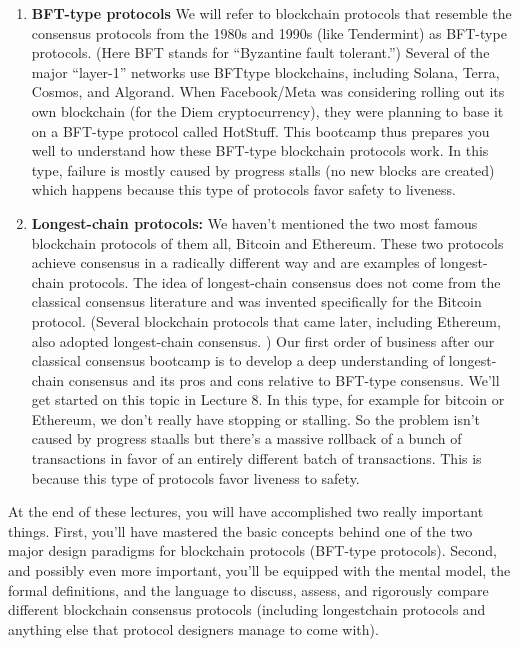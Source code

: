 \begin{enumerate}
    \item \textbf{BFT-type protocols} We will refer to blockchain protocols that resemble the consensus
    protocols from the 1980s and 1990s (like Tendermint) as BFT-type protocols. (Here BFT
    stands for “Byzantine fault tolerant.”) Several of the major “layer-1” networks use BFTtype blockchains, including Solana, Terra, Cosmos, and Algorand. When Facebook/Meta
    was considering rolling out its own blockchain (for the Diem cryptocurrency), they were
    planning to base it on a BFT-type protocol called HotStuff. This bootcamp thus prepares
    you well to understand how these BFT-type blockchain protocols work. In this type, failure is mostly caused by progress stalls (no new blocks are created) which happens because this type of protocols favor safety to liveness.

 \item \textbf{Longest-chain protocols:} We haven't mentioned the two
    most famous blockchain protocols of them all, Bitcoin and Ethereum. These two protocols
    achieve consensus in a radically different way and are examples of longest-chain protocols.
    The idea of longest-chain consensus does not come from the classical consensus literature
    and was invented specifically for the Bitcoin protocol. (Several blockchain protocols that
    came later, including Ethereum, also adopted longest-chain consensus.
    ) Our first order
    of business after our classical consensus bootcamp is to develop a deep understanding of
    longest-chain consensus and its pros and cons relative to BFT-type consensus. We’ll get
    started on this topic in Lecture 8. In this type, for example for bitcoin or Ethereum, we don't really have stopping or stalling. So the problem isn't caused by progress staalls but there's a massive rollback of a bunch of transactions in favor of an entirely different batch of transactions. This is because this type of protocols favor liveness to safety.
\end{enumerate}

At the end of these lectures, you will have accomplished two really important things.
First, you’ll have mastered the basic concepts behind one of the two major design paradigms
for blockchain protocols (BFT-type protocols). Second, and possibly even more important,
you’ll be equipped with the mental model, the formal definitions, and the language to discuss,
assess, and rigorously compare different blockchain consensus protocols (including longestchain protocols and anything else that protocol designers manage to come with).\\

